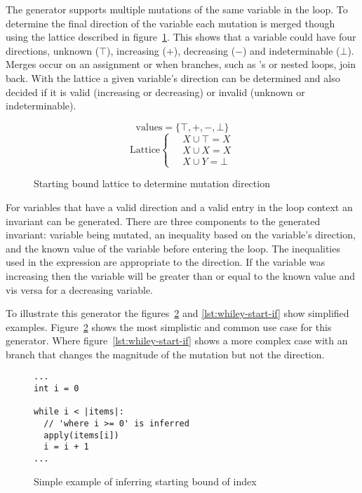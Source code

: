 The generator supports multiple mutations of the same variable in the loop.
To determine the final direction of the variable each mutation is merged though
using the lattice described in figure~\ref{eq:start-lattice}.
This shows that a variable could have four directions, unknown ($\top$),
increasing ($+$), decreasing ($-$) and indeterminable ($\bot$).
Merges occur on an assignment or when branches, 
such as 's or nested loops, join back.
With the lattice a given variable's direction can be determined and also
decided if it is valid (increasing or decreasing) or invalid (unknown or indeterminable).

\begin{figure}
$$\text{values} = \{ \top, +, -, \bot \}$$
\[
\text{Lattice} \begin{cases*}
\quad X \cup \top = X \\
\quad X \cup X = X \\
\quad X \cup Y = \bot
\end{cases*}
\]
\caption{Starting bound lattice to determine mutation direction}
\label{eq:start-lattice}
\end{figure}

For variables that have a valid direction and a valid entry in the loop context an invariant
can be generated.
There are three components to the generated invariant: variable being mutated, an inequality based
on the variable's direction, and the known value of the variable before entering the loop.
The inequalities used in the expression are appropriate to the direction. 
If the variable was increasing then the variable will be greater than or equal to the known value
and vis versa for a decreasing variable.

To illustrate this generator the figures~\ref{lst:whiley-start} and \ref{lst:whiley-start-if}
show simplified examples.
Figure~\ref{lst:whiley-start} shows the most simplistic and common use case for this
generator. Where figure~\ref{lst:whiley-start-if} shows a more complex case 
with an  branch that changes the magnitude of the mutation but not the direction. 

\begin{figure}[ht]
\begin{lstlisting}
...
int i = 0

while i < |items|:
  // 'where i >= 0' is inferred
  apply(items[i])
  i = i + 1
...
\end{lstlisting}
\caption{Simple example of inferring starting bound of index}
\label{lst:whiley-start}
\end{figure}

